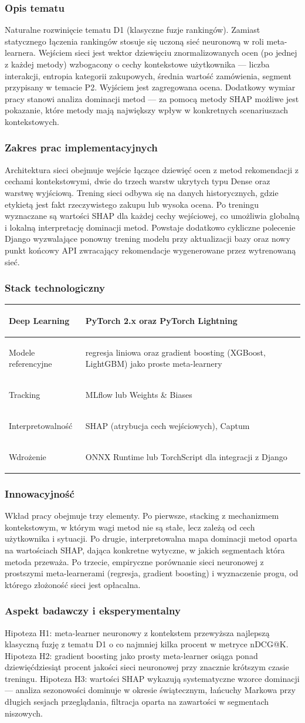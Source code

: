 \documentclass[12pt,a4paper]{article}
\newenvironment{stacktab}{%
    \arrayrulecolor{border}%
    \begin{tabular}{|>{\columncolor{lightbg}\bfseries\color{primary}\raggedright\arraybackslash}p{4.2cm}|>{\raggedright\arraybackslash}p{12cm}|}
    \hline
}{%
    \end{tabular}%
    \arrayrulecolor{black}%
}
\newcommand{\stackrow}[2]{#1 & #2 \\ \hline}
\newcommand{\topicsection}[1]{\subsubsection*{#1}}
\begin{document}
\topicsection{Opis tematu}
Naturalne rozwinięcie tematu D1 (klasyczne fuzje rankingów). Zamiast statycznego łączenia rankingów stosuje się uczoną sieć neuronową w roli meta-learnera. Wejściem sieci jest wektor dziewięciu znormalizowanych ocen (po jednej z każdej metody) wzbogacony o cechy kontekstowe użytkownika --- liczba interakcji, entropia kategorii zakupowych, średnia wartość zamówienia, segment przypisany w temacie P2. Wyjściem jest zagregowana ocena. Dodatkowy wymiar pracy stanowi analiza dominacji metod --- za pomocą metody SHAP możliwe jest pokazanie, które metody mają największy wpływ w konkretnych scenariuszach kontekstowych.

\topicsection{Zakres prac implementacyjnych}
Architektura sieci obejmuje wejście łączące dziewięć ocen z metod rekomendacji z cechami kontekstowymi, dwie do trzech warstw ukrytych typu Dense oraz warstwę wyjściową. Trening sieci odbywa się na danych historycznych, gdzie etykietą jest fakt rzeczywistego zakupu lub wysoka ocena. Po treningu wyznaczane są wartości SHAP dla każdej cechy wejściowej, co umożliwia globalną i lokalną interpretację dominacji metod. Powstaje dodatkowo cykliczne polecenie Django wyzwalające ponowny trening modelu przy aktualizacji bazy oraz nowy punkt końcowy API zwracający rekomendacje wygenerowane przez wytrenowaną sieć.

\topicsection{Stack technologiczny}
\begin{stacktab}
\stackrow{Deep Learning}{PyTorch 2.x oraz PyTorch Lightning}
\stackrow{Modele referencyjne}{regresja liniowa oraz gradient boosting (XGBoost, LightGBM) jako proste meta-learnery}
\stackrow{Tracking}{MLflow lub Weights \& Biases}
\stackrow{Interpretowalność}{SHAP (atrybucja cech wejściowych), Captum}
\stackrow{Wdrożenie}{ONNX Runtime lub TorchScript dla integracji z Django}
\end{stacktab}

\topicsection{Innowacyjność}
Wkład pracy obejmuje trzy elementy. Po pierwsze, stacking z mechanizmem kontekstowym, w którym wagi metod nie są stałe, lecz zależą od cech użytkownika i sytuacji. Po drugie, interpretowalna mapa dominacji metod oparta na wartościach SHAP, dająca konkretne wytyczne, w jakich segmentach która metoda przeważa. Po trzecie, empiryczne porównanie sieci neuronowej z prostszymi meta-learnerami (regresja, gradient boosting) i wyznaczenie progu, od którego złożoność sieci jest opłacalna.

\topicsection{Aspekt badawczy i eksperymentalny}
Hipoteza H1: meta-learner neuronowy z kontekstem przewyższa najlepszą klasyczną fuzję z tematu D1 o co najmniej kilka procent w metryce nDCG@K. Hipoteza H2: gradient boosting jako prosty meta-learner osiąga ponad dziewięćdziesiąt procent jakości sieci neuronowej przy znacznie krótszym czasie treningu. Hipoteza H3: wartości SHAP wykazują systematyczne wzorce dominacji --- analiza sezonowości dominuje w okresie świątecznym, łańcuchy Markowa przy długich sesjach przeglądania, filtracja oparta na zawartości w segmentach niszowych.
\end{document}

